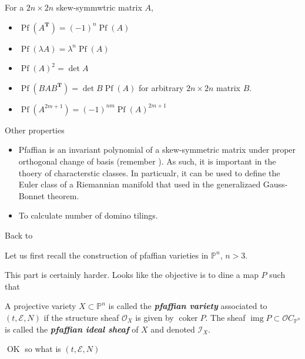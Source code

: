 \begin{prop}\leavevmode
	For a $2n\times 2n$ skew-symmwtric matrix $A$,
	\begin{itemize}
	\item $\operatorname{Pf}(A^{\mathbf{T}})=(-1)^n\operatorname{Pf}(A)$ 
	\item $\operatorname{Pf}(\lambda A)=\lambda^n\operatorname{Pf}(A)$ 
	\item $\operatorname{Pf}(A)^2=\det A$ 
	\item $\operatorname{Pf}(BAB^{\mathbf{T}})=\det B\operatorname{Pf}(A)$ for arbitrary $2n\times 2n$ matrix $B$.
	\item $\operatorname{Pf}(A^{2m+1})=(-1)^{nm}\operatorname{Pf}(A)^{2m+1}$
	\end{itemize}
\end{prop}

\begin{thing1}{Other properties}\leavevmode
	\begin{itemize}
	\item Pfaffian is an invariant polynomial of a skew-symmetric matrix under proper orthogonal change of basis (remember \cite{tud}). As such, it is important in the thoery of characterstic classes. In particualr, it can be used to define the Euler class of a Riemannian manifold that used in the generalizaed Gauss-Bonnet theorem.
	\item To calculate number of domino tilings.
	\end{itemize}
\end{thing1}

{\color{persimmon}Back to \cite{pfaffian}}

Let us first recall the construction of pfaffian varieties in $\mathbb{P}^n$, $n>3$.

{\color{persimmon}This part is certainly harder. Looks like the objective is to dine a map $P$ such that}

\begin{defn}
	A projective variety $X\subset \mathbb{P}^n$ is called the \textit{\textbf{pfaffian variety}} associated to  $(t,\mathcal{E},N)$ if the structure sheaf $\mathcal{O}_X$ is given by $\operatorname{coker} P$. The sheaf $\operatorname{img} P\subset \mathcal{O}C_{\mathbb{P}^n}$ is called the \textit{\textbf{pfaffian ideal sheaf}} of $X$ and denoted $\mathcal{I}_X$.
\end{defn}

{\color{persimmon}$\operatorname{OK}$ so what is $(t,\mathcal{E},N)$}

